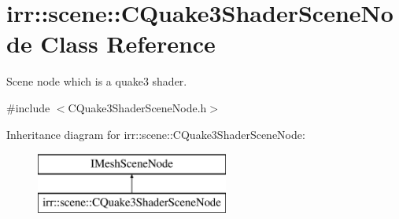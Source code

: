 \hypertarget{classirr_1_1scene_1_1_c_quake3_shader_scene_node}{\section{irr\-:\-:scene\-:\-:C\-Quake3\-Shader\-Scene\-Node Class Reference}
\label{classirr_1_1scene_1_1_c_quake3_shader_scene_node}
}


Scene node which is a quake3 shader.  




{\ttfamily \#include $<$C\-Quake3\-Shader\-Scene\-Node.\-h$>$}

Inheritance diagram for irr\-:\-:scene\-:\-:C\-Quake3\-Shader\-Scene\-Node\-:\begin{figure}[H]
\begin{center}
\leavevmode
\includegraphics[height=2.000000cm]{classirr_1_1scene_1_1_c_quake3_shader_scene_node}
\end{center}
\end{figure}
